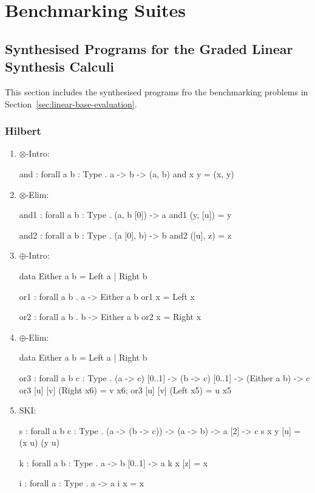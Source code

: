 \chapter{Benchmarking Suites}
\label{appendix:benchmarks}

\section{Synthesised Programs for the Graded Linear Synthesis Calculi}
\label{sec:linear-benchmarks}
This section includes the synthesised programs fro the benchmarking problems in
Section~\ref{sec:linear-base-evaluation}. 

\subsection{Hilbert}
\begin{enumerate}
\item $\otimes$-Intro:
\begin{granule}
and : forall { a b : Type } . a -> b -> (a, b)
and x y = (x, y)
\end{granule}
\item $\otimes$-Elim: \\ 
\begin{granule}
and1 : forall { a b : Type } .  (a, b [0]) -> a
and1 (y, [u]) = y
    
and2 : forall { a b : Type } . (a [0], b) -> b
and2 ([u], z) = z
\end{granule}
\item $\oplus$-Intro: 
\begin{granule}
data Either a b = Left a | Right b

or1 : forall a b . a -> Either a b
or1 x = Left x

or2 : forall a b . b -> Either a b
or2 x = Right x
\end{granule}
\item $\oplus$-Elim: 
\begin{granule}
data Either a b = Left a | Right b

or3 : forall { a b c : Type }
    . (a -> c) [0..1] 
    -> (b -> c) [0..1] 
    -> (Either a b) 
    -> c
or3 [u] [v] (Right x6) = v x6;
or3 [u] [v] (Left x5) = u x5
\end{granule}
\item SKI: 
\begin{granule}
s : forall { a b c : Type } 
  . (a -> (b -> c)) 
  -> (a -> b) 
  -> a [2] 
  -> c
s x y [u] = (x u) (y u)
    
k : forall { a b : Type } . a -> b [0..1] -> a
k x [z] = x
    
i : forall { a : Type } . a -> a
i x = x
\end{granule}
\end{enumerate}


